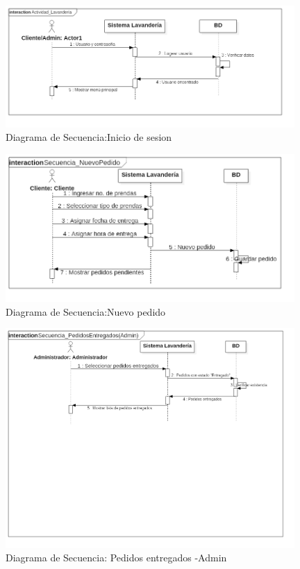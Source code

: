 \begin{figure}[htb]
\begin{center}
\includegraphics[width=11cm]{./imagenes/diagramas/Secuencia_InicioSesion.png}
\end{center}
\caption{Diagrama de Secuencia:Inicio de sesion}
\end{figure}


\begin{figure}[htb]
\begin{center}
\includegraphics[width=11cm]{./imagenes/diagramas/Secuencia_NuevoPedido.png}
\end{center}
\caption{Diagrama de Secuencia:Nuevo pedido}
\end{figure}


\begin{figure}[htb]
\begin{center}
\includegraphics[width=11cm]{./imagenes/diagramas/Secuencia_PedidosEntregados(Admin).png}
\end{center}
\caption{Diagrama de Secuencia: Pedidos entregados -Admin}
\end{figure}


